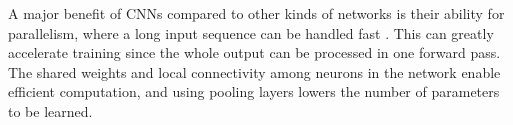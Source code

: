 A major benefit of \acp{CNN} compared to other kinds of networks is their ability for parallelism, where a long input sequence can be handled fast \cite{huzaifah_deep_2021}. This can greatly accelerate training since the whole output can be processed in one forward pass. The shared weights and local connectivity among neurons in the network enable efficient computation, and using pooling layers lowers the number of parameters to be learned.